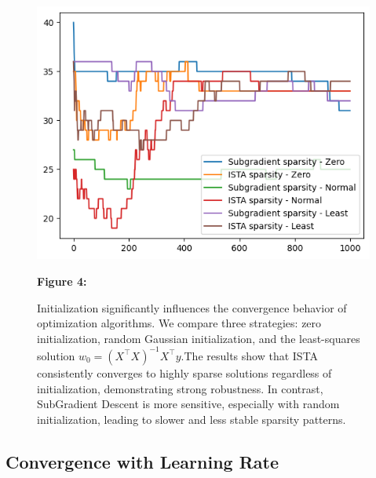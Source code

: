 \documentclass[11pt]{article}
\begin{document}
\begin{figure}[H]
    \centering
    \begin{minipage}{0.3\textwidth}
        \includegraphics[width=\linewidth]{figures/fig6.png}
    \end{minipage}
    \hfill
    \begin{minipage}{0.5\textwidth}
        \small
        \textbf{Figure 4:}

        Initialization significantly influences the convergence behavior of optimization algorithms. We compare three strategies: zero initialization, random Gaussian initialization, and the least-squares solution \( w_0 = (X^\top X)^{-1} X^\top y \).The results show that ISTA consistently converges to highly sparse solutions regardless of initialization, demonstrating strong robustness. In contrast, SubGradient Descent is more sensitive, especially with random initialization, leading to slower and less stable sparsity patterns.


    \end{minipage}
\end{figure}



\subsection{Convergence with Learning Rate}
\end{document}
